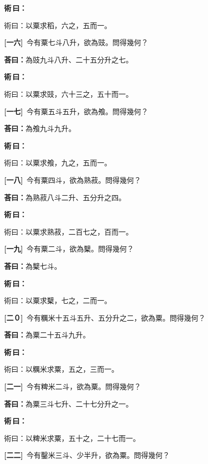 \documentclass[11pt,a4paper]{article}
\newenvironment{method}{%
  \par\noindent\textcolor{methodcolor}{\textbf{術\,曰：}}%
  \ignorespaces
}{\par\vspace{0.5em}}
\newcommand{\problemnum}[1]{\textbf{[\ignorespaces#1\unskip]}}
\begin{document}
\begin{method}
術曰：以粟求稻，六之，五而一。
\end{method}

\noindent\problemnum{一六}\,
今有粟七斗八升，欲為豉。問得幾何？

\noindent\textcolor{answercolor}{\textbf{荅曰：}}為豉九斗八升、二十五分升之七。

\begin{method}
術曰：以粟求豉，六十三之，五十而一。
\end{method}

\noindent\problemnum{一七}\,
今有粟五斗五升，欲為飧。問得幾何？

\noindent\textcolor{answercolor}{\textbf{荅曰：}}為飧九斗九升。

\begin{method}
術曰：以粟求飧，九之，五而一。
\end{method}

\noindent\problemnum{一八}\,
今有粟四斗，欲為熟菽。問得幾何？

\noindent\textcolor{answercolor}{\textbf{荅曰：}}為熟菽八斗二升、五分升之四。

\begin{method}
術曰：以粟求熟菽，二百七之，百而一。
\end{method}

\noindent\problemnum{一九}\,
今有粟二斗，欲為櫱。問得幾何？

\noindent\textcolor{answercolor}{\textbf{荅曰：}}為櫱七斗。

\begin{method}
術曰：以粟求櫱，七之，二而一。
\end{method}

\noindent\problemnum{二０}\,
今有糲米十五斗五升、五分升之二，欲為粟。問得幾何？

\noindent\textcolor{answercolor}{\textbf{荅曰：}}為粟二十五斗九升。

\begin{method}
術曰：以糲米求粟，五之，三而一。
\end{method}

\noindent\problemnum{二一}\,
今有粺米二斗，欲為粟。問得幾何？

\noindent\textcolor{answercolor}{\textbf{荅曰：}}為粟三斗七升、二十七分升之一。

\begin{method}
術曰：以粺米求粟，五十之，二十七而一。
\end{method}

\noindent\problemnum{二二}\,
今有鑿米三斗、少半升，欲為粟。問得幾何？
\end{document}
